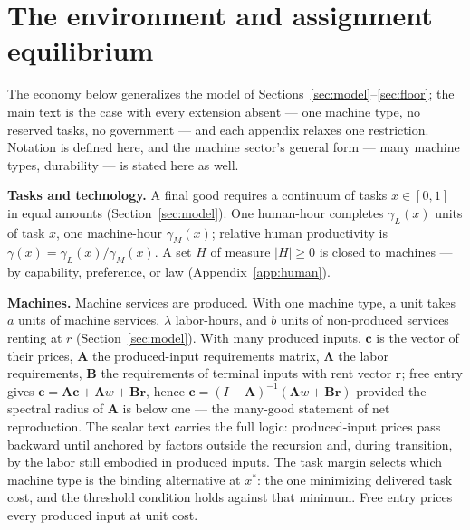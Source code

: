 \documentclass[12pt]{article}
\theoremstyle{plain}
\begin{document}
\section{The environment and assignment equilibrium}\label{app:environment}

The economy below generalizes the model of Sections~\ref{sec:model}--\ref{sec:floor}; the main text is the case with every extension absent --- one machine type, no reserved tasks, no government --- and each appendix relaxes one restriction. Notation is defined here, and the machine sector's general form --- many machine types, durability --- is stated here as well.

\textbf{Tasks and technology.} A final good requires a continuum of tasks $x\in[0,1]$ in equal amounts (Section~\ref{sec:model}). One human-hour completes $\gamma _L(x)$ units of task $x$, one machine-hour $\gamma _M(x)$; relative human productivity is $\gamma (x) = \gamma _L(x)/\gamma _M(x)$. A set $H$ of measure $|H| \ge 0$ is closed to machines --- by capability, preference, or law (Appendix~\ref{app:human}).

\textbf{Machines.} Machine services are produced. With one machine type, a unit takes $a$ units of machine services, $\lambda$ labor-hours, and $b$ units of non-produced services renting at $r$ (Section~\ref{sec:model}). With many produced inputs, $\mathbf{c}$ is the vector of their prices, $\mathbf{A}$ the produced-input requirements matrix, $\boldsymbol{\Lambda}$ the labor requirements, $\mathbf{B}$ the requirements of terminal inputs with rent vector $\mathbf{r}$; free entry gives $\mathbf{c} = \mathbf{A}\mathbf{c} + \boldsymbol{\Lambda}w + \mathbf{B}\mathbf{r}$, hence $\mathbf{c} = (I-\mathbf{A})^{-1}(\boldsymbol{\Lambda}w + \mathbf{B}\mathbf{r})$ provided the spectral radius of $\mathbf{A}$ is below one --- the many-good statement of net reproduction. The scalar text carries the full logic: produced-input prices pass backward until anchored by factors outside the recursion and, during transition, by the labor still embodied in produced inputs. The task margin selects which machine type is the binding alternative at $x^*$: the one minimizing delivered task cost, and the threshold condition holds against that minimum. Free entry prices every produced input at unit cost.
\end{document}
